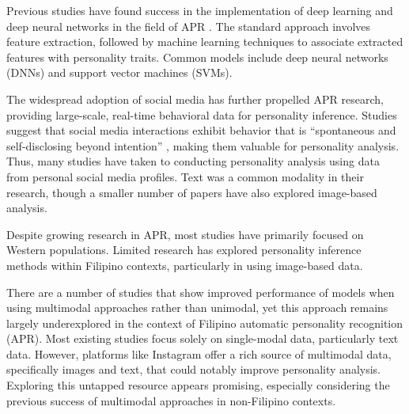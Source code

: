 Previous studies have found success in the implementation of deep learning and deep neural networks in the field of APR \citep{Zhao2022}. The standard approach involves feature extraction, followed by machine learning techniques to associate extracted features with personality traits. Common models include deep neural networks (DNNs) and support vector machines (SVMs). 

The widespread adoption of social media has further propelled APR research, providing large-scale, real-time behavioral data for personality inference. Studies suggest that social media interactions exhibit behavior that is “spontaneous and self-disclosing beyond intention” \citep{Vinciarelli2014}, making them valuable for personality analysis. Thus, many studies have taken to conducting personality analysis using data from personal social media profiles. Text was a common modality in their research, though a smaller number of papers have also explored image-based analysis. 

Despite growing research in APR, most studies have primarily focused on Western populations. Limited research has explored personality inference methods within Filipino contexts, particularly in using image-based data.

There are a number of studies that show improved performance of models when using multimodal approaches rather than unimodal, yet this approach remains largely underexplored in the context of Filipino automatic personality recognition (APR). Most existing studies focus solely on single-modal data, particularly text data. However, platforms like Instagram offer a rich source of multimodal data, specifically images and text, that could notably improve personality analysis. Exploring this untapped resource appears promising, especially considering the previous success of multimodal approaches in non-Filipino contexts.

